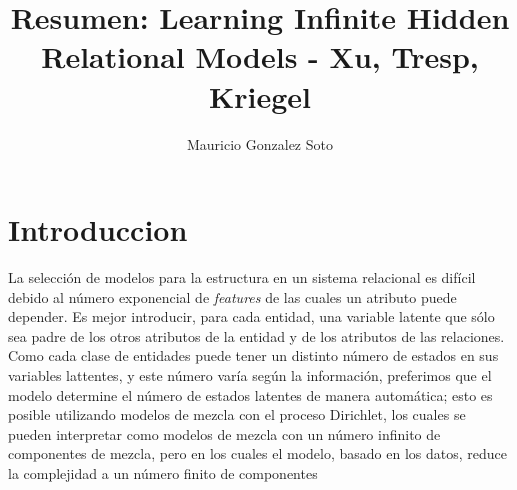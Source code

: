 \documentclass[11pt]{article}
\title{Resumen: Learning Infinite Hidden Relational Models - Xu, Tresp, Kriegel}
\author{Mauricio Gonzalez Soto}
\theoremstyle{plain}
\begin{document}
\nocite{*}
\maketitle
\section{Introduccion}
La selección de modelos para la estructura en un sistema relacional es difícil debido al número exponencial de \textit{features} de las cuales un atributo puede depender. Es mejor introducir, para cada entidad, una variable latente que sólo sea padre de los otros atributos de la entidad y de los atributos de las relaciones. Como cada clase de entidades puede tener un distinto número de estados en sus variables lattentes, y este número varía según la información, preferimos que el modelo determine el número de estados latentes de manera automática; esto es posible utilizando modelos de mezcla con el proceso Dirichlet, los cuales se pueden interpretar como modelos de mezcla con un número infinito de componentes de mezcla, pero en los cuales el modelo, basado en los datos, reduce la complejidad a un número finito de componentes


\end{document}
